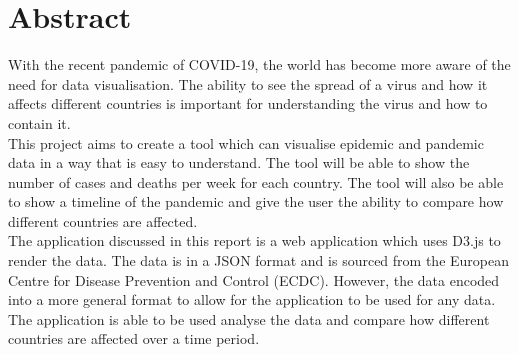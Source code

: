 \documentclass{report}
\begin{document}
\chapter{Abstract}
With the recent pandemic of COVID-19, the world has become more aware of the need for data visualisation. The ability to see the spread of a virus and how it affects different countries is important for understanding the virus and how to contain it.\\
This project aims to create a tool which can visualise epidemic and pandemic data in a way that is easy to understand. The tool will be able to show the number of cases and deaths per week for each country. The tool will also be able to show a timeline of the pandemic and give the user the ability to compare how different countries are affected.\\
The application discussed in this report is a web application which uses D3.js to render the data. The data is in a JSON format and is sourced from the European Centre for Disease Prevention and Control (ECDC). However, the data encoded into a more general format to allow for the application to be used for any data.\\
The application is able to be used analyse the data and compare how different countries are affected over a time period.

\newpage

\end{document}
